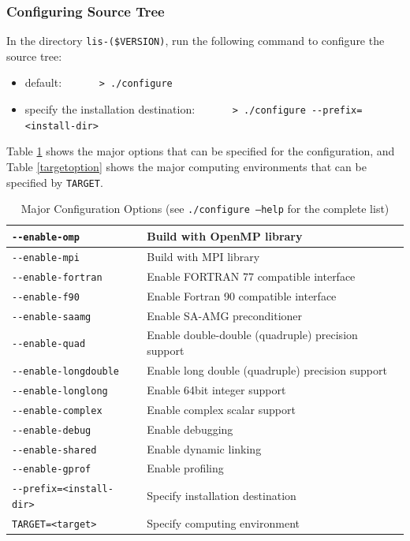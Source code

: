 \documentclass[a4paper]{article}
\begin{document}
\subsubsection{Configuring Source Tree}
 In the directory {\tt lis-(\$VERSION)}, run the following command to configure the source tree:
 \begin{itemize}
\item default: \verb&      > ./configure&
\item specify the installation destination: \verb&      > ./configure --prefix=<install-dir>&
\end{itemize}
Table \ref{configoption} shows the major options that can be specified for
the configuration, and 
Table \ref{targetoption} shows the major computing environments that can be specified 
by \verb+TARGET+. 
\begin{table}[htbp]
\caption{Major Configuration Options (see {\tt ./configure --help} for
 the complete list)}
\label{configoption}
\begin{center}
\begin{tabular}{|l|l|}
\hline
\verb+--enable-omp+      & Build with OpenMP library\\ \hline
\verb+--enable-mpi+      & Build with MPI library\\ \hline
\verb+--enable-fortran+  & Enable FORTRAN 77 compatible interface\\ \hline
\verb+--enable-f90+      & Enable Fortran 90 compatible interface\\ \hline
\verb+--enable-saamg+    & Enable SA-AMG preconditioner\\ \hline
\verb+--enable-quad+     & Enable double-double (quadruple)
 precision support\\ \hline
\verb+--enable-longdouble+ & Enable long double (quadruple)
 precision support\\ \hline
\verb+--enable-longlong+ & Enable 64bit integer support\\ \hline
\verb+--enable-complex+  & Enable complex scalar support\\ \hline 
\verb+--enable-debug+    & Enable debugging\\ \hline
\verb+--enable-shared+   & Enable dynamic linking\\ \hline
\verb+--enable-gprof+    & Enable profiling\\ \hline
\verb+--prefix=<install-dir>+    & Specify installation destination\\ \hline
\verb+TARGET=<target>+   & Specify computing environment\\ \hline

\end{tabular}
\end{center}
\end{table}
\end{document}
